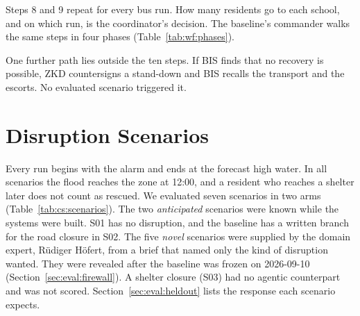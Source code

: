 Steps 8 and 9 repeat for every bus run. How many residents go to each school,
and on which run, is the coordinator's decision. The baseline's commander walks
the same steps in four phases (Table~\ref{tab:wf:phases}).



One further path lies outside the ten steps. If BIS finds that no recovery is
possible, ZKD countersigns a stand-down and BIS recalls the transport and the
escorts. No evaluated scenario triggered it.

\section{Disruption Scenarios}
\label{sec:cs:disruptions}

Every run begins with the alarm and ends at the forecast high water. In all
scenarios the flood reaches the zone at 12:00, and a resident who reaches a
shelter later does not count as rescued. We evaluated seven scenarios in two
arms (Table~\ref{tab:cs:scenarios}). The two \emph{anticipated} scenarios were
known while the systems were built. S01 has no disruption, and the baseline
has a written branch for the road closure in S02. The five \emph{novel} scenarios were supplied by the domain expert,
Rüdiger Höfert, from a brief that named only the kind of disruption wanted.
They were revealed after the baseline was frozen on 2026-09-10
(Section~\ref{sec:eval:firewall}). A shelter closure (S03) had no agentic
counterpart and was not scored. Section~\ref{sec:eval:heldout} lists the
response each scenario expects.


